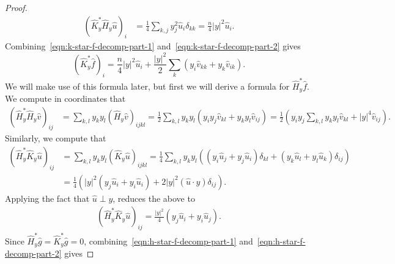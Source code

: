 \documentclass[10pt,a4paper]{amsart}
\newcommand{\abs}[1]{\lvert #1 \rvert}
\begin{document}
\begin{proof}
\begin{equation}
\label{eqn:k-star-f-decomp-part-2}
\begin{split}
(\widehat{K}^*_y\widehat{H}_y\widehat u)_i
&=
\frac14
\sum_{k,j}
y^2_j\widehat u_i\delta_{kk}=
\frac{n}{4}
\abs{y}^2
\widehat u_i.
\end{split}
\end{equation}
Combining~\eqref{eqn:k-star-f-decomp-part-1} and~\eqref{eqn:k-star-f-decomp-part-2} gives
\begin{equation}
\label{eqn:hat-k-f}
(\widehat{K}^*_y\widehat f)_i
=
\frac{n}{4}
\abs{y}^2
\widehat u_i
+
\frac{\abs{y}^2}{2}
\sum_{k}
\left(
y_i\widehat v_{kk}
+
y_k\widehat v_{ik}
\right).
\end{equation}
We will make use of this formula later, but first we will derive a formula for $\widehat{H}^*_y\widehat f$. We compute in coordinates that
\begin{equation}
\label{eqn:h-star-f-decomp-part-1}
\begin{split}
(\widehat{H}^*_y\widehat{H}_y\widehat v)_{ij}
&=
\sum_{k,l}
y_ky_l(\widehat{H}_y\widehat v)_{ijkl}
=
\frac12
\sum_{k,l}
y_ky_l
\left(
y_iy_j\widehat v_{kl}
+
y_ky_l\widehat v_{ij}
\right)
=
\frac12
\left(
y_iy_j
\sum_{k,l}
y_ky_l\widehat v_{kl}
+
\abs{y}^4
\widehat v_{ij}
\right)
.
\end{split}
\end{equation}
Similarly, we compute that
\begin{equation}
\begin{split}
(\widehat{H}^*_y\widehat{K}_y\widehat u)_{ij}
&=
\sum_{k,l}
y_ky_l
(\widehat{K}_y\widehat u)_{ijkl}
=
\frac{1}{4}
\sum_{k,l}
y_ky_l
\left(
(y_i\widehat u_j + y_j\widehat u_i)\delta_{kl}
+
(y_k\widehat u_l + y_l\widehat u_k)\delta_{ij}
\right)
\\
&=
\frac{1}{4}
\left(
\abs{y}^2
(y_j\widehat u_i + y_i\widehat u_i)
+
2
\abs{y}^2
(\widehat u \cdot y)
\delta_{ij}
\right).
\end{split}
\end{equation}
Applying the fact that $\widehat u \perp y$, reduces the above to
\begin{equation}
\label{eqn:h-star-f-decomp-part-2}
\begin{split}
(\widehat{H}^*_y\widehat{K}_y\widehat u)_{ij}
=
\frac{\abs{y}^2}{4}
\left(
y_j\widehat u_i+y_i\widehat u_j
\right).
\end{split}
\end{equation}
Since $\widehat{H}^*_y\widehat g = \widehat{K}^*_y\widehat g = 0$,  combining~\eqref{eqn:h-star-f-decomp-part-1} and~\eqref{eqn:h-star-f-decomp-part-2} gives

\end{proof}
\end{document}

